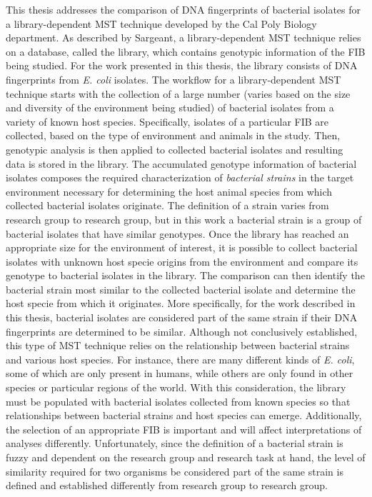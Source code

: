 \documentclass[12pt]{ucthesis}
\begin{document}
   This thesis addresses the comparison of DNA fingerprints of
   bacterial isolates for a library-dependent MST technique developed by the
   Cal Poly Biology department. As described by Sargeant, a library-dependent
   MST technique relies on a database, called the library, which contains
   genotypic information of the FIB being studied. For the work presented in
   this thesis, the library consists of DNA fingerprints from \textit{E. coli}
   isolates. The workflow for a library-dependent MST technique starts with the
   collection of a large number (varies based on the size and diversity of the
   environment being studied) of bacterial isolates from a variety of known
   host species. Specifically, isolates of a particular FIB are collected, based on
   the type of environment and animals in the study. Then, genotypic analysis is
   then applied to collected bacterial isolates and resulting data is stored in
   the library. The accumulated genotype information of bacterial isolates
   composes the required characterization of \textit{bacterial strains} in the
   target environment necessary for determining the host animal species from
   which collected bacterial isolates originate. The definition of a strain
   varies from research group to research group, but in this work a bacterial
   strain is a group of bacterial isolates that have similar genotypes. Once
   the library has reached an appropriate size for the environment of interest,
   it is possible to collect bacterial isolates with unknown host specie
   origins from the environment and compare its genotype to bacterial isolates in
   the library. The comparison can then identify the bacterial strain most
   similar to the collected bacterial isolate and determine the host specie
   from which it originates. More specifically, for the work described in this
   thesis, bacterial isolates are considered part of the same strain if their
   DNA fingerprints are determined to be similar. Although not conclusively
   established, this type of MST technique relies on the relationship between
   bacterial strains and various host species. For instance, there are many
   different kinds of \textit{E. coli}, some of which are only present in
   humans, while others are only found in other species or particular regions
   of the world. With this consideration, the library must be populated with
   bacterial isolates collected from known species so that relationships
   between bacterial strains and host species can emerge. Additionally, the
   selection of an appropriate FIB is important and will affect interpretations
   of analyses differently. Unfortunately, since the definition of a bacterial
   strain is fuzzy and dependent on the research group and research task at
   hand, the level of similarity required for two organisms be considered part
   of the same strain is defined and established differently from research
   group to research group.
\end{document}
